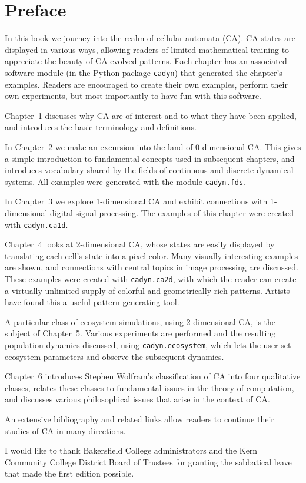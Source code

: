 \chapter*{Preface}

In this book we journey into the realm of cellular automata (CA).
CA states are displayed in various ways, allowing readers of limited
mathematical training to appreciate the beauty of CA-evolved patterns.
Each chapter has an associated software module (in the Python package
\texttt{cadyn}) that generated the chapter's examples.  Readers are
encouraged to create their own examples, perform their own experiments,
but most importantly to have fun with this software.

Chapter~1 discusses why CA are of interest and to what they have been
applied, and introduces the basic terminology and definitions.

In Chapter~2 we make an excursion into the land of 0-dimensional CA.
This gives a simple introduction to fundamental concepts used in
subsequent chapters, and introduces vocabulary shared by the fields of
continuous and discrete dynamical systems.  All examples were generated
with the module \texttt{cadyn.fds}.

In Chapter~3 we explore 1-dimensional CA and exhibit connections with
1-dimensional digital signal processing.  The examples of this chapter
were created with \texttt{cadyn.ca1d}.

Chapter~4 looks at 2-dimensional CA, whose states are easily displayed
by translating each cell's state into a pixel color.  Many visually
interesting examples are shown, and connections with central topics in
image processing are discussed.  These examples were created with
\texttt{cadyn.ca2d}, with which the reader can create a virtually
unlimited supply of colorful and geometrically rich patterns.  Artists
have found this a useful pattern-generating tool.

A particular class of ecosystem simulations, using 2-dimensional CA, is
the subject of Chapter~5.  Various experiments are performed and the
resulting population dynamics discussed, using
\texttt{cadyn.ecosystem}, which lets the user set ecosystem parameters
and observe the subsequent dynamics.

Chapter~6 introduces Stephen Wolfram's classification of CA into four
qualitative classes, relates these classes to fundamental issues in the
theory of computation, and discusses various philosophical issues that
arise in the context of CA.

An extensive bibliography and related links allow readers to continue
their studies of CA in many directions.

I would like to thank Bakersfield College administrators and the Kern
Community College District Board of Trustees for granting the
sabbatical leave that made the first edition possible.
